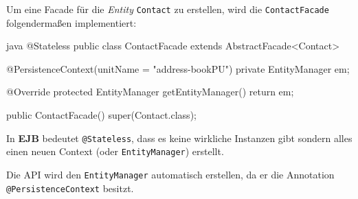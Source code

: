 Um eine Facade für die \textit{Entity} \texttt{Contact} zu erstellen, wird die \texttt{ContactFacade} folgendermaßen implementiert:

\begin{code}{java}
    @Stateless
    public class ContactFacade extends AbstractFacade<Contact> {
        @PersistenceContext(unitName = "address-bookPU")
        private EntityManager em;

        @Override
        protected EntityManager getEntityManager() {
            return em;
        }

        public ContactFacade() {
            super(Contact.class);
        }
    }
\end{code}

In \textbf{EJB} bedeutet \texttt{@Stateless}, dass es keine wirkliche Instanzen gibt sondern alles einen neuen Context (oder \texttt{EntityManager}) erstellt.

Die API wird den \texttt{EntityManager} automatisch erstellen, da er die Annotation \texttt{@PersistenceContext} besitzt.
